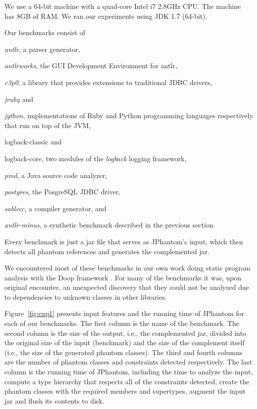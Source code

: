 We use a 64-bit machine with a quad-core Intel i7 2.8GHz CPU. The
machine has 8GB of RAM. We ran our experiments using JDK 1.7
(64-bit).

Our benchmarks consist of%
\begin{inparaenum}[(1)]
\item \emph{antlr}, a parser generator,
\item \emph{antlrworks}, the GUI Development Environment for antlr,
\item \emph{c3p0}, a library that provides extensions to traditional
  JDBC drivers,
\item \emph{jruby} and
\item \emph{jython}, implementations of Ruby and Python programming
  languages respectively that run on top of the JVM,
\item logback-classic and
\item logback-core, two modules of the \emph{logback} logging
  framework,
\item \emph{pmd}, a Java source code analyzer,
\item \emph{postgres}, the PosgreSQL JDBC driver,
\item \emph{sablecc}, a compiler generator, and
\item \emph{antlr-minus}, a synthetic benchmark described in the
  previous section.
\end{inparaenum}
Every benchmark is just a jar file that serves as JPhantom's
input, which then detects all phantom references and generates the
complemented jar.

We encountered most of these benchmarks in our own work doing static
program analysis with the Doop
framework \cite{BS-OOPSLA09,hybrid-pldi13}. For many of the benchmarks
it was, upon original encounter, an unexpected discovery that they
could not be analyzed due to dependencies to unknown classes in other
libraries.

Figure~\ref{fig:exp1} presents input features and the running time of
JPhantom for each of our benchmarks. The first column is the name of
the benchmark. The second column is the size of the output, i.e., the
complemented jar, divided into the original size of the input
(benchmark) and the size of the complement itself (i.e., the size of
the generated phantom classes). The third and fourth columns are the
number of phantom classes and constraints detected respectively. The
last column is the running time of JPhantom, including the time to
analyze the input, compute a type hierarchy that respects all of the
constraints detected, create the phantom classes with the required
members and supertypes, augment the input jar and flush its contents
to disk.

